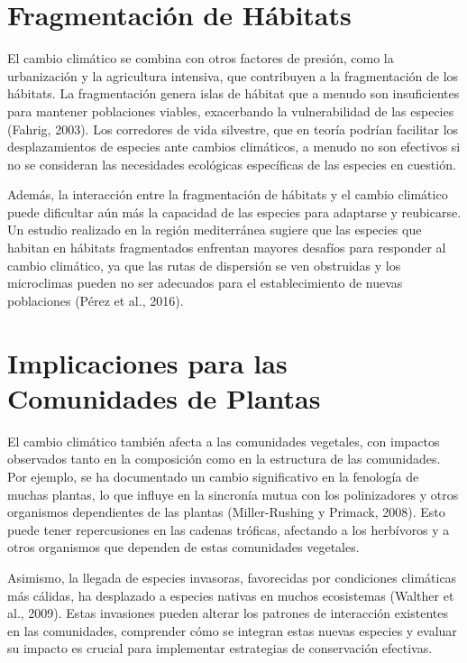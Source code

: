\documentclass[
  letterpaper,
  DIV=11,
  numbers=noendperiod,
  oneside]{scrreprt}
\begin{document}
\section{Fragmentación de
Hábitats}\label{fragmentaciuxf3n-de-huxe1bitats}

El cambio climático se combina con otros factores de presión, como la
urbanización y la agricultura intensiva, que contribuyen a la
fragmentación de los hábitats. La fragmentación genera islas de hábitat
que a menudo son insuficientes para mantener poblaciones viables,
exacerbando la vulnerabilidad de las especies (Fahrig, 2003). Los
corredores de vida silvestre, que en teoría podrían facilitar los
desplazamientos de especies ante cambios climáticos, a menudo no son
efectivos si no se consideran las necesidades ecológicas específicas de
las especies en cuestión.

Además, la interacción entre la fragmentación de hábitats y el cambio
climático puede dificultar aún más la capacidad de las especies para
adaptarse y reubicarse. Un estudio realizado en la región mediterránea
sugiere que las especies que habitan en hábitats fragmentados enfrentan
mayores desafíos para responder al cambio climático, ya que las rutas de
dispersión se ven obstruidas y los microclimas pueden no ser adecuados
para el establecimiento de nuevas poblaciones (Pérez et al., 2016).

\section{Implicaciones para las Comunidades de
Plantas}\label{implicaciones-para-las-comunidades-de-plantas}

El cambio climático también afecta a las comunidades vegetales, con
impactos observados tanto en la composición como en la estructura de las
comunidades. Por ejemplo, se ha documentado un cambio significativo en
la fenología de muchas plantas, lo que influye en la sincronía mutua con
los polinizadores y otros organismos dependientes de las plantas
(Miller-Rushing y Primack, 2008). Esto puede tener repercusiones en las
cadenas tróficas, afectando a los herbívoros y a otros organismos que
dependen de estas comunidades vegetales.

Asimismo, la llegada de especies invasoras, favorecidas por condiciones
climáticas más cálidas, ha desplazado a especies nativas en muchos
ecosistemas (Walther et al., 2009). Estas invasiones pueden alterar los
patrones de interacción existentes en las comunidades, comprender cómo
se integran estas nuevas especies y evaluar su impacto es crucial para
implementar estrategias de conservación efectivas.
\end{document}
